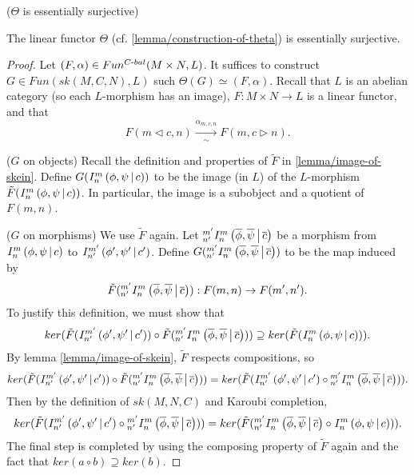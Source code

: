 \begin{lemma}\label{lemma/theta-is-essentially-surjective} ($\Theta$ is essentially surjective)

  \noindent The linear functor $\Theta$ (cf. \ref{lemma/construction-of-theta}) is essentially surjective.
\end{lemma}

\begin{proof}
  Let $(F, \alpha) \in Fun^{C{\text -}bal}(M \times N, L)$. It suffices to construct
  $G \in Fun(sk(M,C,N), L)$ such $\Theta(G) \simeq (F,\alpha)$. Recall that $L$ is an abelian
  category (so each $L$-morphism has an image), $F: M \times N \to L$ is a linear
  functor, and that
  \[
    F(m \lhd c, n) \xrightarrow[\sim]{\alpha_{m,c,n}} F(m, c \rhd n).
  \]

  \noindent ($G$ on objects) Recall the definition and properties of
  $\tilde{F}$ in \ref{lemma/image-of-skein}. Define
  $G({}^{}_{} I^{m}_{n} \left( \phi, \psi \,\middle|\, c \right))$ to be the image (in $L$) of the
  $L$-morphism $\tilde{F}({}^{}_{} I^{m}_{n} \left( \phi, \psi \,\middle|\, c \right))$. In particular, the
  image is a subobject and a quotient of $F(m,n)$.

  \noindent ($G$ on morphisms) We use $\tilde{F}$ again. Let
  ${}^{m'}_{n'} I^{m}_{n} \left( \overline{\phi}, \overline{\psi} \,\middle|\, \overline{c} \right)$ be a morphism
  from ${}^{}_{} I^{m}_{n} \left( \phi, \psi \,\middle|\, c \right)$ to ${}^{}_{} I^{m'}_{n'} \left( \phi', \psi' \,\middle|\, c' \right)$. Define
  $G({}^{m'}_{n'} I^{m}_{n} \left( \overline{\phi}, \overline{\psi} \,\middle|\, \overline{c} \right))$ to be the
  map induced by
  \[
    \tilde{F}({}^{m'}_{n'} I^{m}_{n} \left( \overline{\phi}, \overline{\psi} \,\middle|\, \overline{c} \right)): F(m,n) \to F(m',n').
  \]
  To justify this definition, we must show that
  \[
    ker(
    \tilde{F}({}^{}_{} I^{m'}_{n'} \left( \phi', \psi' \,\middle|\, c' \right))
    \circ
    \tilde{F}({}^{m'}_{n'} I^{m}_{n} \left( \overline{\phi}, \overline{\psi} \,\middle|\, \overline{c} \right))
    )
    \supseteq
    ker(\tilde{F}({}^{}_{} I^{m}_{n} \left( \phi, \psi \,\middle|\, c \right))).
  \]
  By lemma \ref{lemma/image-of-skein}, $\tilde{F}$ respects compositions, so
  \[
    ker(
    \tilde{F}({}^{}_{} I^{m'}_{n'} \left( \phi', \psi' \,\middle|\, c' \right))
    \circ
    \tilde{F}({}^{m'}_{n'} I^{m}_{n} \left( \overline{\phi}, \overline{\psi} \,\middle|\, \overline{c} \right))
    )
    =
    ker(
    \tilde{F}({}^{}_{} I^{m'}_{n'} \left( \phi', \psi' \,\middle|\, c' \right)
    \circ
    {}^{m'}_{n'} I^{m}_{n} \left( \overline{\phi}, \overline{\psi} \,\middle|\, \overline{c} \right))
    ).
  \]
  Then by the definition of $sk(M,N,C)$ and Karoubi completion,
  \[
    ker(
    \tilde{F}({}^{}_{} I^{m'}_{n'} \left( \phi', \psi' \,\middle|\, c' \right)
    \circ
    {}^{m'}_{n'} I^{m}_{n} \left( \overline{\phi}, \overline{\psi} \,\middle|\, \overline{c} \right))
    )
    =
    ker(
    \tilde{F}(
    {}^{m'}_{n'} I^{m}_{n} \left( \overline{\phi}, \overline{\psi} \,\middle|\, \overline{c} \right)
    \circ
    {}^{}_{} I^{m}_{n} \left( \phi, \psi \,\middle|\, c \right)
    )
    ).
  \]
  The final step is completed by using the composing property of $\tilde{F}$ again and the fact that
  $ker(a \circ b) \supseteq ker(b)$.
\end{proof}

